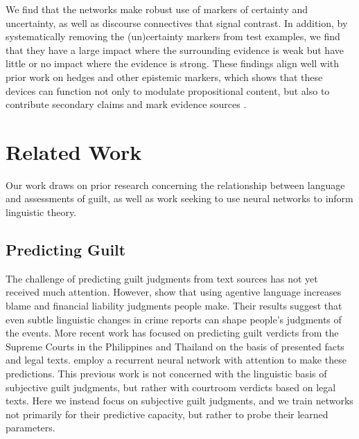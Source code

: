 \documentclass[11pt,a4paper]{article}
\newcommand{\word}[1]{\emph{#1}}
\begin{document}
We find that the networks make robust use of markers of certainty and uncertainty, as well as discourse connectives that signal contrast. In addition, by systematically removing the (un)certainty markers from test examples, we find that they have a large impact where the surrounding evidence is weak but have little or no impact where the evidence is strong. These findings align well with prior work on hedges and other epistemic markers, which shows that these devices can function not only to modulate propositional content, but also to contribute secondary claims and mark evidence sources \citep{Simons07,vonFintel:Gillies:2010,deMarneffe:Manning:Potts:2012,White-etal:2018}.



\section{Related Work}

Our work draws on prior research concerning the relationship between language and assessments of guilt, as well as work seeking to use neural networks to inform linguistic theory.


\subsection{Predicting Guilt}
The challenge of predicting guilt judgments from text sources has not yet received much attention. 
However, \citet{Fausey:Boroditsky:2010} show that using agentive language increases blame and financial liability judgments people make. Their results suggest that even subtle linguistic changes in crime reports can shape people's judgments of the events.
More recent work has focused on predicting guilt verdicts from the Supreme Courts in the Philippines \citep{virtucio2018predicting} and Thailand \citep{kowsrihawat2018predicting} on the basis of presented facts  and legal texts. \citeauthor{kowsrihawat2018predicting} employ a recurrent neural network with attention to make these predictions.
This previous work is not concerned with the linguistic basis of subjective guilt judgments, but rather with courtroom verdicts based on legal texts. Here we instead focus on subjective guilt judgments, and we train networks not primarily for their predictive capacity, but rather to probe their learned parameters.
\end{document}
